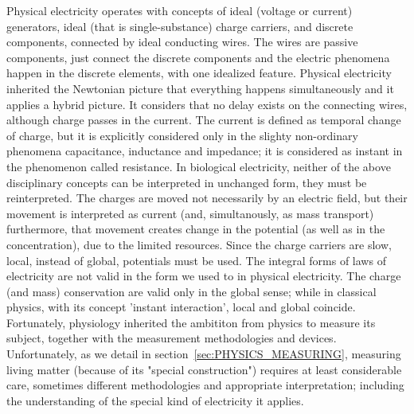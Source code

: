 \ifx\magyar\undefined
Physical electricity operates with concepts of ideal (voltage or current) generators, ideal (that is single-substance) charge carriers, and discrete components, connected by ideal conducting wires.
The wires are passive components, just connect
the discrete components and the electric phenomena happen in the 
discrete elements, with one idealized feature.
Physical electricity inherited the Newtonian picture that everything happens simultaneously and it applies a hybrid picture.
It considers that no delay exists on the connecting wires, although charge passes in the current.  
The current is defined as temporal change of charge,
but it is explicitly considered only in the slighty non-ordinary 
phenomena capacitance, inductance and impedance; it is considered
as instant in the phenomenon called resistance.
In biological electricity, neither of the above  disciplinary concepts
can be interpreted in unchanged form, they must be reinterpreted. The charges are moved not necessarily by an electric field,
but their movement is interpreted as current (and, simultanously, as mass transport) furthermore,
that movement creates change in the potential (as well as in the concentration), due to the limited resources.
Since the charge carriers are slow,
local, instead of global, potentials must be used. 
The integral forms of laws of electricity are not valid in the form
we used to in physical electricity. The charge (and mass) conservation
are valid only in the global sense; while in classical physics, with its concept 'instant interaction', local and global coincide.
%
Fortunately, physiology inherited the ambititon from physics to measure its subject, together with the measurement methodologies and devices. Unfortunately,
as we detail in section~\ref{sec:PHYSICS_MEASURING}, measuring living matter (because of its "special construction") requires at least considerable care,
sometimes different methodologies and appropriate interpretation; including the understanding of the special kind of electricity it applies.

\else

\fi

